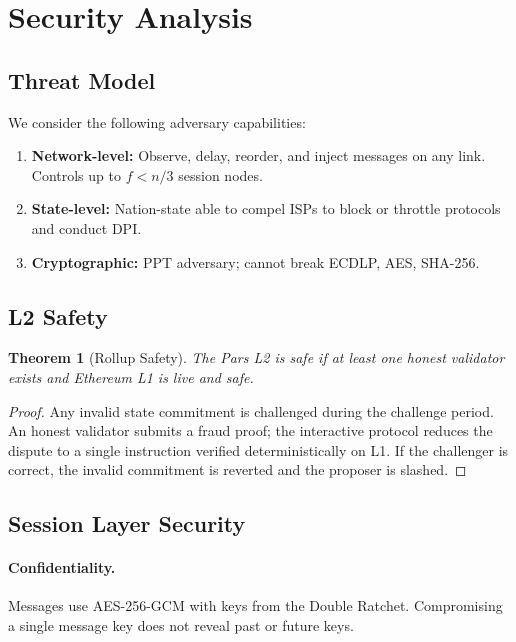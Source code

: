 \documentclass[11pt,a4paper]{article}
\newtheorem{theorem}{Theorem}[section]
\begin{document}
\section{Security Analysis}
\label{sec:security}

\subsection{Threat Model}

We consider the following adversary capabilities:

\begin{enumerate}
    \item \textbf{Network-level:} Observe, delay, reorder, and inject
    messages on any link.  Controls up to $f < n/3$ session nodes.

    \item \textbf{State-level:} Nation-state able to compel ISPs to block
    or throttle protocols and conduct DPI.

    \item \textbf{Cryptographic:} PPT adversary; cannot break ECDLP, AES,
    SHA-256.
\end{enumerate}

\subsection{L2 Safety}

\begin{theorem}[Rollup Safety]
    The Pars L2 is safe if at least one honest validator exists and
    Ethereum L1 is live and safe.
\end{theorem}

\begin{proof}
    Any invalid state commitment is challenged during the challenge
    period.  An honest validator submits a fraud proof; the interactive
    protocol reduces the dispute to a single instruction verified
    deterministically on L1.  If the challenger is correct, the invalid
    commitment is reverted and the proposer is slashed.
\end{proof}

\subsection{Session Layer Security}

\paragraph{Confidentiality.}
Messages use AES-256-GCM with keys from the Double Ratchet.  Compromising
a single message key does not reveal past or future keys.
\end{document}
